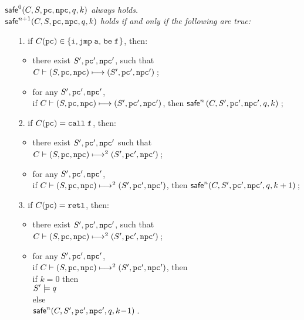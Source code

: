 \begin{definition}
	\label{def:safety}
	\em
	\mbox{} \\
    $\safe{0}(\code, \state, \pc, \npc, \astQ, k)$
    always holds. \\
    $\safe{n+1}(\code, \state, \pc, \npc, \astQ, k)$ holds if and only if
	the following are true:
	
	\small
	\begin{enumerate}
		\item[1.] if $\code(\pc) \in \{ \simplins, \jmp \; \aexp, \, \be \; \lab{} \}$, then:
		\begin{itemize}
			\item
			there exist $\state', \pc', \npc'$, such that \\
			$\ptrans{(\state, \pc, \npc)}{(\state', \pc', \npc')}$\,;
			
			\item
			for any $\state', \pc', \npc'$, \\ if 
			$\ptrans{(\state, \pc, \npc)}{(\state', \pc', \npc')}$, then
			$\safe{n} \, (\code, \state', \pc', \npc', \astQ, k)$\,;
		\end{itemize}
		
		\item[2.] if $\code(\pc) = \call \; \lab{}$, then:
		\begin{itemize}
			\item
			there exist $\state', \pc', \npc'$ such that \\
			$\multiptrans{2}{(\state, \pc, \npc)}{(\state', \pc', \npc')}$\,;
			
			\item
			for any $S', \pc', \npc'$, \\ if
			$\multiptrans{2}{(S, \pc, \npc)}{(S', \pc', \npc')}$, 
			then $\safe{n}(C, S', \pc', \npc', q, k+1)$\,;
		\end{itemize}
		
		\item[3.] if $\code(\pc) = \retl$, then:
		\begin{itemize}
			\item
			there exist $\state', \pc', \npc'$, such that \\
			$\multiptrans{2}{(\state, \pc, \npc)}
							{(\state', \pc', \npc')}$\,;
			
			\item
			for any $\state', \pc', \npc'$, \\ if
			$\multiptrans{2}{(S, \pc, \npc)}{(\state', \pc', \npc')}$,
				then \\
			if $k = 0$ then \\
			\hspace*{1cm} $\asrtmodel{\state'}{\astQ}$ \\
			else \\
			\hspace*{1cm}
				$\safe{n}(\code, \state', \pc', \npc', \astQ, k\!-\!1)$\,.
		\end{itemize}
	\end{enumerate}
\end{definition}

